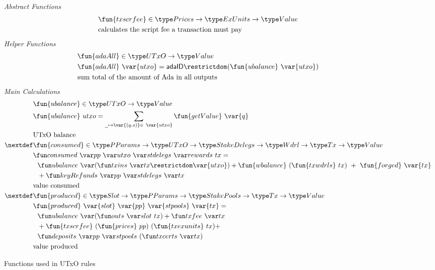 \begin{figure}[htb]
  \emph{Abstract Functions}
  \begin{align*}
    & \fun{txscrfee} \in \Prices \to \ExUnits \to \Value \\
    & \text{calculates the script fee a transaction must pay} \\
  \end{align*}
  \emph{Helper Functions}
  \begin{align*}
    & \fun{adaAll} \in \UTxO \to \Value \\
    & \fun{adaAll}~{\var{utxo}} =
          \mathsf{adaID} \restrictdom   (\fun{ubalance}~\var{utxo}) \\
    & \text{sum total of the amount of Ada in all outputs} \\
  \end{align*}
  \emph{Main Calculations}
  \begin{align*}
    & \fun{ubalance} \in \UTxO \to \Value \\
    & \fun{ubalance} ~ utxo = \sum_{\wcard\mapsto\var{(q,s)}\in~\var{utxo}}
    \fun{getValue}~\var{q} \\
    & \text{UTxO balance} \\
    \nextdef
    & \fun{consumed} \in \PParams \to \UTxO \to \StakeDelegs \to \Wdrl \to \Tx \to \Value \\
    & \consumed{pp}{utxo}{stdelegs}{rewards}~{tx} = \\
    & ~~\ubalance{(\txins{tx} \restrictdom \var{utxo})} +
        \fun{wbalance}~(\fun{txwdrls}~{tx})~+~\fun{forged}~\var{tx} \\
    & ~~ + \keyRefunds{pp}{stdelegs}{tx} \\
    & \text{value consumed} \\
    \nextdef
    & \fun{produced} \in \Slot \to \PParams \to \StakePools \to \Tx \to \Value \\
    & \fun{produced}~\var{slot}~\var{pp}~\var{stpools}~\var{tx} = \\
    &~~\ubalance{(\outs{slot}~{tx})}  + \txfee{tx} \\
    &~~ + \fun{txscrfee}~(\fun{prices}~{pp})~(\fun{txexunits}~{tx}) + \\
    &~~ \deposits{pp}{stpools}~{(\txcerts{tx})}\\
    & \text{value produced} \\
  \end{align*}
  \caption{Functions used in UTxO rules}
  \label{fig:functions:utxo}
\end{figure}

